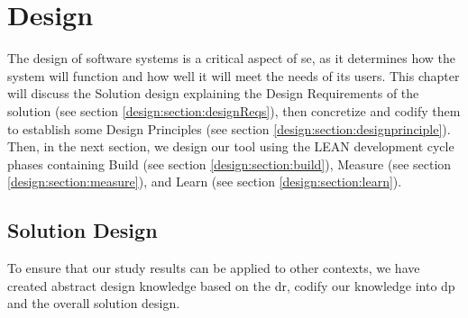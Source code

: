 
\chapter{Design}

\ifpdf
    \graphicspath{{Chapters/Design/Figs/}{Chapters/Design/Figs/}{Chapters/Design/Figs/}}
\else
    \graphicspath{{Chapters/Design/Figs/}{Chapters/Design/Figs/}}
\fi
The design of software systems is a critical aspect of \ac{se}, as it determines how the system will function and how well it will meet the needs of its users.
This chapter will discuss the Solution design explaining the Design Requirements of the solution (see section \ref{design:section:designReqs}), then concretize and codify them to establish some Design Principles (see section \ref{design:section:designprinciple}).
Then, in the next section, we design our tool using the LEAN development cycle phases containing Build (see section \ref{design:section:build}), Measure (see section \ref{design:section:measure}), and Learn (see section \ref{design:section:learn}).  
\section{Solution Design}
\label{design:section:soldesign}
To ensure that our study results can be applied to other contexts, we have created abstract design knowledge based on the \ac{dr}, codify our knowledge into \ac{dp} and the overall solution design.
